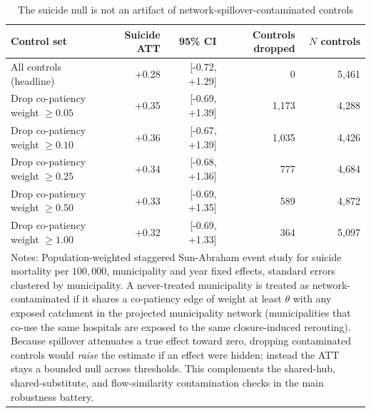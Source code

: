\begin{table}[!htbp]\centering
\caption{The suicide null is not an artifact of network-spillover-contaminated controls}
\label{tab:network-spillover}
\small
\begin{tabular}{lrrrr}
\toprule
Control set & Suicide ATT & 95\% CI & Controls dropped & $N$ controls \\
\midrule
All controls (headline) & +0.28 & [-0.72, +1.29] & 0 & 5{,}461 \\
\midrule
Drop co-patiency weight $\geq 0.05$ & +0.35 & [-0.69, +1.39] & 1{,}173 & 4{,}288 \\
Drop co-patiency weight $\geq 0.10$ & +0.36 & [-0.67, +1.39] & 1{,}035 & 4{,}426 \\
Drop co-patiency weight $\geq 0.25$ & +0.34 & [-0.68, +1.36] & 777 & 4{,}684 \\
Drop co-patiency weight $\geq 0.50$ & +0.33 & [-0.69, +1.35] & 589 & 4{,}872 \\
Drop co-patiency weight $\geq 1.00$ & +0.32 & [-0.69, +1.33] & 364 & 5{,}097 \\
\bottomrule
\multicolumn{5}{p{0.94\textwidth}}{\footnotesize Notes: Population-weighted staggered Sun-Abraham event study for suicide mortality per $100{,}000$, municipality and year fixed effects, standard errors clustered by municipality. A never-treated municipality is treated as network-contaminated if it shares a co-patiency edge of weight at least $\theta$ with any exposed catchment in the projected municipality network (municipalities that co-use the same hospitals are exposed to the same closure-induced rerouting). Because spillover attenuates a true effect toward zero, dropping contaminated controls would \emph{raise} the estimate if an effect were hidden; instead the ATT stays a bounded null across thresholds. This complements the shared-hub, shared-substitute, and flow-similarity contamination checks in the main robustness battery.}\\
\end{tabular}
\end{table}

